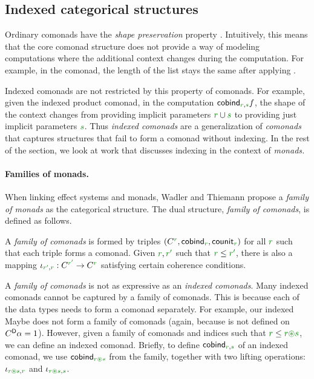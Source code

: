 \subsection{Indexed categorical structures}
\label{sec:semantics-related-related}

Ordinary comonads have the \emph{shape preservation} property \cite{comonads-codo}. Intuitively,
this means that the core comonad structure does not provide a way of modeling computations where
the additional context changes during the computation. For example, in the  comonad,
the length of the list stays the same after applying .

Indexed comonads are not restricted by this property of comonads. For example, given the indexed
product comonad, in the computation $\ident{cobind}_{\cclrd{r}, \cclrd{s}} f$, the shape of
the context changes from providing implicit parameters $\cclrd{r} \cup \cclrd{s}$  to providing
just implicit parameters $\cclrd{s}$. Thus \emph{indexed comonads} are a generalization of
\emph{comonads} that captures structures that fail to form a comonad without indexing. In the
rest of the section, we look at work that discusses indexing in the context of \emph{monads.}

\paragraph{Families of monads.}
When linking effect systems and monads, Wadler and Thiemann \cite{monad-notions} propose a
\emph{family of monads} as the categorical structure. The dual structure, \emph{family of
comonads}, is defined as follows.

\begin{definition}
\label{def:flat-family}
A \emph{family of comonads} is formed by triples $(\ctyp{\cclrd{r}}{}, \ident{cobind}_{\cclrd{r}},
  \ident{counit}_{\cclrd{r}})$ for all $\cclrd{r}$ such that each triple forms a comonad. Given
$\cclrd{r}, \cclrd{r'}$ such that $\cclrd{r} \leq \cclrd{r'}$, there is also a mapping
$\iota_{\cclrd{r'}, \cclrd{r}} : \ctyp{\cclrd{r'}}{} \rightarrow \ctyp{\cclrd{r}}{}$ satisfying
certain coherence conditions.
\end{definition}

\noindent
A \emph{family of comonads} is not as expressive as an \emph{indexed comonads}. Many indexed
comonads cannot be captured by a family of comonads. This is because each of the data
types needs to form a comonad separately. For example, our indexed Maybe does not form a family of
comonads (again, because  is not defined on $C^{\textnormal{\sffamily D}}\alpha=1$). However, given
a family of comonads and indices such that $\cclrd{r} \leq \cclrd{r}\cseq\cclrd{s}$, we can define
an indexed comonad. Briefly, to define $\ident{cobind}_{\cclrd{r},\cclrd{s}}$ of an indexed comonad,
we use $\ident{cobind}_{\cclrd{r}\cseq\cclrd{s}}$ from the family, together with two lifting operations:
$\iota_{\cclrd{r}\cseq\cclrd{s}, \cclrd{r}}$ and $\iota_{\cclrd{r}\cseq\cclrd{s}, \cclrd{s}}$.

